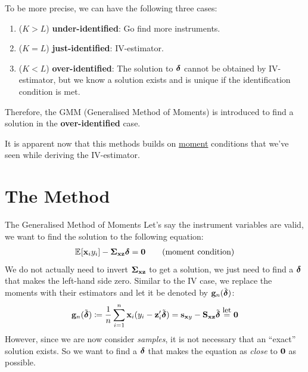 \documentclass{beamer}
\begin{document}
\begin{frame}{}
	To be more precise, we can have the following three cases:
	\begin{enumerate}
		\item($K>L$) \textbf{under-identified}: Go find more instruments.
		\item($K=L$) \textbf{just-identified}: IV-estimator.
		\item($K<L$) \textbf{over-identified}:
			The solution to $\boldsymbol{\delta}$ cannot be obtained by IV-estimator,
			but we know a solution exists and is unique if the identification
			condition is met.
	\end{enumerate}
	\begin{block}{}
		Therefore, the GMM (Generalised Method of Moments) is introduced to
		find a solution in the \textbf{over-identified} case.
	\end{block}
	It is apparent now that this methods builds on \underline{moment} conditions
	that we've seen while deriving the IV-estimator.
\end{frame}

\section{The Method}

\begin{frame}{The Generalised Method of Moments}
	Let's say the instrument variables are valid,
	we want to find the solution to the following equation:
	\begin{align*}
		\operatorname{\mathbb{E}}_{}\!\left[\mathbf{x}_i y_i\right] - \boldsymbol{\Sigma}_{\mathbf{x}\mathbf{z}}\boldsymbol{\delta} = \mathbf{0} \tag{moment condition}
	\end{align*}
	We do not actually need to invert $\boldsymbol{\Sigma}_{\mathbf{x}\mathbf{z}}$ to get a
	solution,
	we just need to find a $\boldsymbol{\delta}$ that makes the left-hand side zero.
	Similar to the IV case, we replace the
	moments with their estimators and let it be denoted by
	$\mathbf{g}_n(\tilde{\boldsymbol{\delta}})$:
	\begin{align*}
		\mathbf{g}_n(\tilde{\boldsymbol{\delta}})
		\coloneqq \frac1n \sum_{i=1}^{n} \mathbf{x}_i(y_i - \mathbf{z}_i'\tilde{\boldsymbol{\delta}})
		= \mathbf{s}_{\mathbf{x} y} - \mathbf{S}_{\mathbf{x}\mathbf{z}}\tilde{\boldsymbol{\delta}}
		\overset{\text{\small let}}{=} \mathbf{0}
	\end{align*}
	However, since we are now consider \emph{samples},
	it is not necessary that an ``exact'' solution exists.
	So we want to find a $\boldsymbol{\delta}$ that makes the equation as \emph{close} to $\mathbf{0}$ as possible.
\end{frame}
\end{document}
